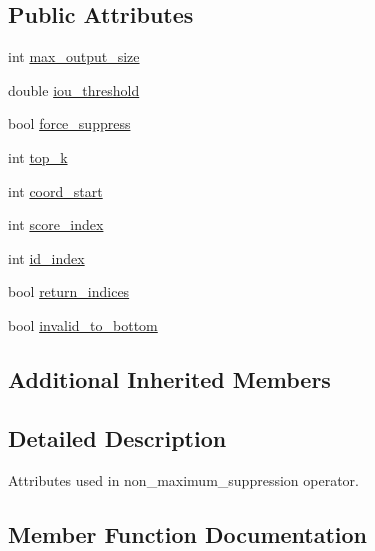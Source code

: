 \subsection*{Public Attributes}
\begin{DoxyCompactItemize}
\item 
int \hyperlink{structtvm_1_1relay_1_1NonMaximumSuppressionAttrs_a71dd0bfee474b0d269aceaba8b9dcc9e}{max\+\_\+output\+\_\+size}
\item 
double \hyperlink{structtvm_1_1relay_1_1NonMaximumSuppressionAttrs_a354b5d03f1473e32abe2d797e4f0d8a0}{iou\+\_\+threshold}
\item 
bool \hyperlink{structtvm_1_1relay_1_1NonMaximumSuppressionAttrs_afe99a1c828b06460ea747ce859a44bdd}{force\+\_\+suppress}
\item 
int \hyperlink{structtvm_1_1relay_1_1NonMaximumSuppressionAttrs_ad9e2e281399a290410757e948784b93a}{top\+\_\+k}
\item 
int \hyperlink{structtvm_1_1relay_1_1NonMaximumSuppressionAttrs_a19d7377e75dd9b0db212a04a53155427}{coord\+\_\+start}
\item 
int \hyperlink{structtvm_1_1relay_1_1NonMaximumSuppressionAttrs_aef590e963d5af653e09e6327808c4723}{score\+\_\+index}
\item 
int \hyperlink{structtvm_1_1relay_1_1NonMaximumSuppressionAttrs_a30440265e31b996c01f9732be77156cb}{id\+\_\+index}
\item 
bool \hyperlink{structtvm_1_1relay_1_1NonMaximumSuppressionAttrs_a595087194062b5cce8a36479fa82716b}{return\+\_\+indices}
\item 
bool \hyperlink{structtvm_1_1relay_1_1NonMaximumSuppressionAttrs_a51ab0634c017ed9a2fbf8706f22365dc}{invalid\+\_\+to\+\_\+bottom}
\end{DoxyCompactItemize}
\subsection*{Additional Inherited Members}


\subsection{Detailed Description}
Attributes used in non\+\_\+maximum\+\_\+suppression operator. 

\subsection{Member Function Documentation}
